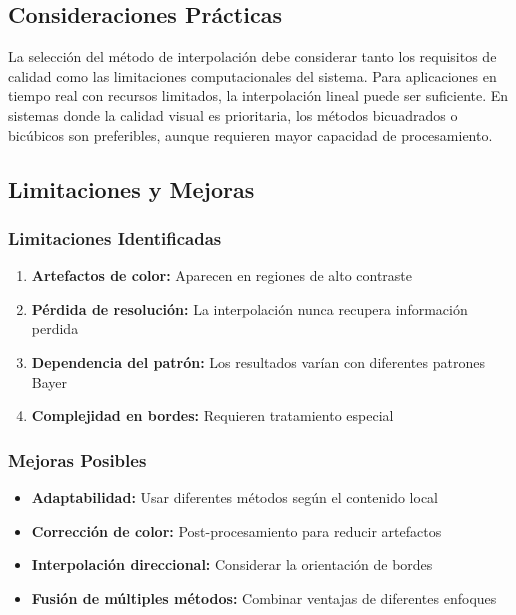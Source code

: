 \subsection{Consideraciones Prácticas}

La selección del método de interpolación debe considerar tanto los requisitos de calidad como las limitaciones computacionales del sistema. Para aplicaciones en tiempo real con recursos limitados, la interpolación lineal puede ser suficiente. En sistemas donde la calidad visual es prioritaria, los métodos bicuadrados o bicúbicos son preferibles, aunque requieren mayor capacidad de procesamiento.

\subsection{Limitaciones y Mejoras}

\subsubsection{Limitaciones Identificadas}
\begin{enumerate}
    \item \textbf{Artefactos de color:} Aparecen en regiones de alto contraste
    \item \textbf{Pérdida de resolución:} La interpolación nunca recupera información perdida
    \item \textbf{Dependencia del patrón:} Los resultados varían con diferentes patrones Bayer
    \item \textbf{Complejidad en bordes:} Requieren tratamiento especial
\end{enumerate}

\subsubsection{Mejoras Posibles}
\begin{itemize}
    \item \textbf{Adaptabilidad:} Usar diferentes métodos según el contenido local
    \item \textbf{Corrección de color:} Post-procesamiento para reducir artefactos
    \item \textbf{Interpolación direccional:} Considerar la orientación de bordes
    \item \textbf{Fusión de múltiples métodos:} Combinar ventajas de diferentes enfoques
\end{itemize}